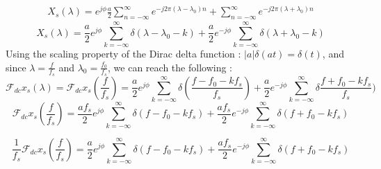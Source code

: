 \documentclass[14pt]{article}
\begin{document}
\begin{enumerate}[label=\alph*)]
	\begin{align*}
		X_s(\lambda) = e^{j\phi}\frac{a}{2}\sum_{n=-\infty}^{\infty}e^{-j2\pi (\lambda - \lambda_0) n} + \sum_{n=-\infty}^{\infty}e^{-j2\pi (\lambda + \lambda_0) n}
 	\end{align*}
 	\begin{equation*}
 	\boxed{
 		X_s(\lambda) = \frac{a}{2}e^{j\phi}\sum_{k = -\infty}^{\infty}\delta(\lambda - \lambda_0 - k) +\frac{a}{2}e^{-j\phi}\sum_{k = -\infty}^{\infty}\delta(\lambda + \lambda_0 - k)}
 	\end{equation*}
Using the scaling property of the Dirac delta function : $|a|\delta(at) = \delta(t)$, and since $\lambda = \frac{f}{f_s}$ and $\lambda_0 = \frac{f_0}{f_s}$, we can reach the following : 
	\begin{equation*}
		\mathcal{F}_{dc}x_s(\lambda) = \mathcal{F}_{dc}x_s(\frac{f}{f_s}) = \frac{a}{2}e^{j\phi}\sum_{k = -\infty}^{\infty}\delta(\frac{f-f_0 - kf_s}{f_s}) +  \frac{a}{2}e^{-j\phi}\sum_{k = -\infty}^{\infty}\delta{\frac{f+f_0 - kf_s}{f_s})}
	\end{equation*}
	\begin{equation*}
		\mathcal{F}_{dc}x_s(\frac{f}{f_s}) =  \frac{af_s}{2}e^{j\phi}\sum_{k = -\infty}^{\infty}\delta(f-f_0 - kf_s) +  \frac{af_s}{2}e^{-j\phi}\sum_{k = -\infty}^{\infty}\delta(f+f_0 - kf_s)
	\end{equation*}	

	\begin{equation*}
		\boxed{\frac{1}{f_s}\mathcal{F}_{dc}x_s(\frac{f}{f_s}) =  \frac{a}{2}e^{j\phi}\sum_{k = -\infty}^{\infty}\delta(f-f_0 - kf_s) +  \frac{af_s}{2}e^{-j\phi}\sum_{k = -\infty}^{\infty}\delta(f+f_0 - kf_s)}
	\end{equation*}


\end{enumerate}
\end{document}
